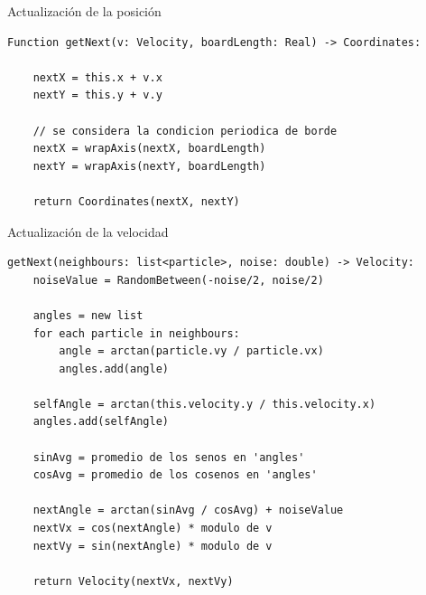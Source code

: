 
    



\begin{frame}[fragile]{Actualización de la posición}
  \begin{lstlisting}
Function getNext(v: Velocity, boardLength: Real) -> Coordinates:

    nextX = this.x + v.x
    nextY = this.y + v.y
    
    // se considera la condicion periodica de borde
    nextX = wrapAxis(nextX, boardLength)
    nextY = wrapAxis(nextY, boardLength)

    return Coordinates(nextX, nextY)
  \end{lstlisting}
\end{frame}

\begin{frame}[fragile]{Actualización de la velocidad}
  \begin{lstlisting}
getNext(neighbours: list<particle>, noise: double) -> Velocity:
    noiseValue = RandomBetween(-noise/2, noise/2)
    
    angles = new list
    for each particle in neighbours:
        angle = arctan(particle.vy / particle.vx)
        angles.add(angle)

    selfAngle = arctan(this.velocity.y / this.velocity.x)
    angles.add(selfAngle)

    sinAvg = promedio de los senos en 'angles'
    cosAvg = promedio de los cosenos en 'angles'

    nextAngle = arctan(sinAvg / cosAvg) + noiseValue
    nextVx = cos(nextAngle) * modulo de v
    nextVy = sin(nextAngle) * modulo de v

    return Velocity(nextVx, nextVy)
  \end{lstlisting}
\end{frame}